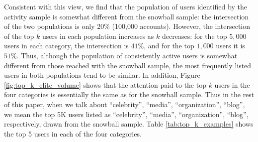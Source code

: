 \documentclass[phd,tocprelim]{cornell}
\renewcommand{\caption}[1]{\singlespacing\hangcaption{#1}\normalspacing}
\begin{document}



Consistent with this view, we find that the population of users identified
by the activity sample is somewhat different from the snowball sample: the
intersection of the two populations is only 20$\%$ (100,000
accounts). However, the intersection of the top $k$ users in each
population increases as $k$ decreases: for the top $5,000$ users in each
category, the intersection is $41\%$, and for the top $1,000$ users it is
$51\%$. Thus, although the population of consistently active users is
somewhat different from those reached with the snowball sample, the most
frequently listed users in both populations tend to be similar. In
addition, Figure \ref{fig:top_k_elite_volume} shows that the attention paid
to the top $k$ users in the four categories is essentially the same as for
the snowball sample.  Thus in the rest of this paper, when we talk about
``celebrity'', ``media'', ``organization'', ``blog'', we mean the top 5K
users listed as ``celebrity'', ``media'', ``organization'', ``blog'',
respectively, drawn from the snowball sample. Table
\ref{tab:top_k_examples} shows the top 5 users in each of
the four categories.


\end{document}
